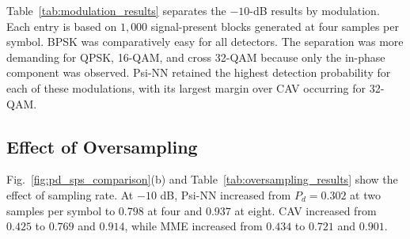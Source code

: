\documentclass[conference]{IEEEtran}
\begin{document}
Table~\ref{tab:modulation_results} separates the $-10$-dB results by
modulation. Each entry is based on $1{,}000$ signal-present blocks
generated at four samples per symbol. BPSK was comparatively easy for
all detectors. The separation was more demanding for QPSK, 16-QAM,
and cross 32-QAM because only the in-phase component was observed.
Psi-NN retained the highest detection probability for each of these
modulations, with its largest margin over CAV occurring for 32-QAM.

\begin{table}[!t]
\centering
\caption{Detection probability by modulation at $-10$ dB and four
samples per symbol.}
\label{tab:modulation_results}
\end{table}

\subsection{Effect of Oversampling}
\label{subsec:oversampling_results}


Fig.~\ref{fig:pd_sps_comparison}(b) and
Table~\ref{tab:oversampling_results} show the effect of sampling rate.
At $-10$ dB, Psi-NN increased from $P_d=0.302$ at two samples per
symbol to $0.798$ at four and $0.937$ at eight. CAV increased from
$0.425$ to $0.769$ and $0.914$, while MME increased from $0.434$ to
$0.721$ and $0.901$.

\begin{table}[!t]
\centering
\caption{Detection probability at $-10$ dB for different numbers of
samples per symbol. The target false-alarm probability is $0.01$.}
\label{tab:oversampling_results}
\end{table}
\end{document}
